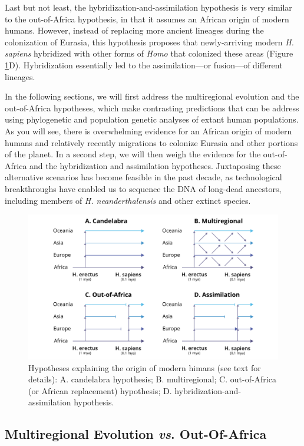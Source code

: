 \documentclass[
]{book}
\begin{document}
Last but not least, the hybridization-and-assimilation hypothesis is very similar to the out-of-Africa hypothesis, in that it assumes an African origin of modern humans. However, instead of replacing more ancient lineages during the colonization of Eurasia, this hypothesis proposes that newly-arriving modern \emph{H. sapiens} hybridized with other forms of \emph{Homo} that colonized these areas (Figure \ref{fig:hypotheses}D). Hybridization essentially led to the assimilation---or fusion---of different lineages.

In the following sections, we will first address the multiregional evolution and the out-of-Africa hypotheses, which make contrasting predictions that can be address using phylogenetic and population genetic analyses of extant human populations. As you will see, there is overwhelming evidence for an African origin of modern humans and relatively recently migrations to colonize Eurasia and other portions of the planet. In a second step, we will then weigh the evidence for the out-of-Africa and the hybridization and assimilation hypotheses. Juxtaposing these alternative scenarios has become feasible in the past decade, as technological breakthroughs have enabled us to sequence the DNA of long-dead ancestors, including members of \emph{H. neanderthalensis} and other extinct species.

\begin{figure}
\includegraphics[width=1\linewidth]{images/human_hypotheses} \caption{Hypotheses explaining the origin of modern himans (see text for details): A. candelabra hypothesis; B. multiregional; C. out-of-Africa (or African replacement) hypothesis; D. hybridization-and-assimilation hypothesis.}\label{fig:hypotheses}
\end{figure}

\hypertarget{multiregional-evolution-vs.-out-of-africa}{%
\subsection{\texorpdfstring{Multiregional Evolution \emph{vs}. Out-Of-Africa}{Multiregional Evolution vs. Out-Of-Africa}}\label{multiregional-evolution-vs.-out-of-africa}}
\end{document}
